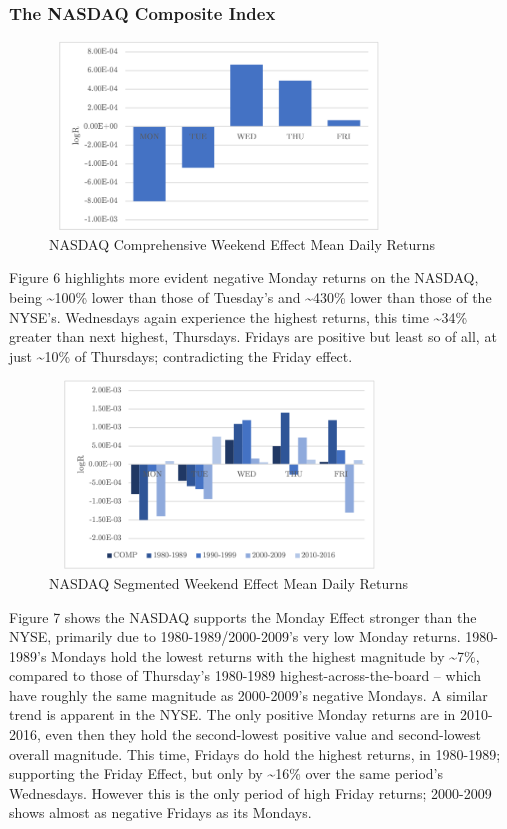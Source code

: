 \documentclass[11pt, english]{article}
\begin{document}
		\subsubsection{The NASDAQ Composite Index}

	\begin{figure}[H]
        \begin{center}
                \includegraphics[width=9cm,height=5cm]{NAS-WE1.png}
                \caption{NASDAQ Comprehensive Weekend Effect Mean Daily Returns}
        \end{center}
        \end{figure}

	Figure 6 highlights more evident negative Monday returns on the NASDAQ, being \~{}100\% lower than those of Tuesday’s and \~{}430\% lower than those of the NYSE’s. Wednesdays again experience the highest returns, this time \~{}34\% greater than next highest, Thursdays. Fridays are positive but least so of all, at just \~{}10\% of Thursdays; contradicting the Friday effect.

	\begin{figure}[H]
        \begin{center}
                \includegraphics[width=9cm,height=5cm]{NAS-WE2.png} 
                \caption{NASDAQ Segmented Weekend Effect Mean Daily Returns}
        \end{center}
        \end{figure}
		
	Figure 7 shows the NASDAQ supports the Monday Effect stronger than the NYSE, primarily due to 1980-1989/2000-2009’s very low Monday returns. 1980-1989’s Mondays hold the lowest returns with the highest magnitude by \~{}7\%, compared to those of Thursday’s 1980-1989 highest-across-the-board – which have roughly the same magnitude as 2000-2009’s negative Mondays. A similar trend is apparent in the NYSE. The only positive Monday returns are in 2010-2016, even then they hold the second-lowest positive value and second-lowest overall magnitude. This time, Fridays do hold the highest returns, in 1980-1989; supporting the Friday Effect, but only by \~{}16\% over the same period’s Wednesdays. However this is the only period of high Friday returns; 2000-2009 shows almost as negative Fridays as its Mondays.
\end{document}
